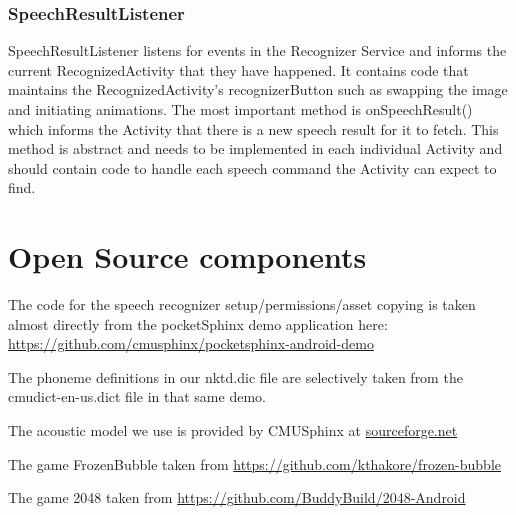 \documentclass[11pt, oneside]{article}
\begin{document}
\subsubsection{SpeechResultListener}
SpeechResultListener listens for events in the Recognizer Service and informs the current RecognizedActivity that they have happened. It contains code that maintains the RecognizedActivity's recognizerButton such as swapping the image and initiating animations. The most important method is onSpeechResult() which informs the Activity that there is a new speech result for it to fetch. This method is abstract and needs to be implemented in each individual Activity and should contain code to handle each speech command the Activity can expect to find. 

\section{Open Source components}

The code for the speech recognizer setup/permissions/asset copying is
taken almost directly from the pocketSphinx demo application here:
\url{https://github.com/cmusphinx/pocketsphinx-android-demo}

The phoneme definitions in our nktd.dic file are selectively taken
from the cmudict-en-us.dict file in that same demo.

The acoustic model we use is provided by CMUSphinx at
\href{https://sourceforge.net/projects/cmusphinx/files/Acoustic\%20and\%20Language\%20Models/US\%20English/}{sourceforge.net}

The game FrozenBubble taken from
\url{https://github.com/kthakore/frozen-bubble}

The game 2048 taken from
\url{https://github.com/BuddyBuild/2048-Android}
    
\end{document}
